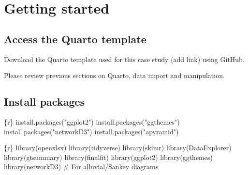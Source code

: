 \documentclass[
  letterpaper,
  DIV=11,
  numbers=noendperiod,
  oneside]{scrreprt}
\newenvironment{Shaded}{\begin{snugshade}}{\end{snugshade}}
\newcommand{\CommentTok}[1]{\textcolor[rgb]{0.37,0.37,0.37}{#1}}
\newcommand{\FunctionTok}[1]{\textcolor[rgb]{0.28,0.35,0.67}{#1}}
\newcommand{\InformationTok}[1]{\textcolor[rgb]{0.37,0.37,0.37}{#1}}
\newcommand{\NormalTok}[1]{\textcolor[rgb]{0.00,0.23,0.31}{#1}}
\newcommand{\StringTok}[1]{\textcolor[rgb]{0.13,0.47,0.30}{#1}}
\begin{document}
\hypertarget{getting-started-1}{%
\section{Getting started}\label{getting-started-1}}

\hypertarget{access-the-quarto-template-1}{%
\subsection{Access the Quarto
template}\label{access-the-quarto-template-1}}

Download the Quarto template used for this case study (add link) using
GitHub.

Please review previous sections on Quarto, data import and manipulation.

\hypertarget{install-packages-1}{%
\subsection{Install packages}\label{install-packages-1}}

\begin{Shaded}
\begin{Highlighting}[]
\InformationTok{\textasciigrave{}\textasciigrave{}\textasciigrave{}\{r\}}
\FunctionTok{install.packages}\NormalTok{(}\StringTok{"ggplot2"}\NormalTok{)}
\FunctionTok{install.packages}\NormalTok{(}\StringTok{"ggthemes"}\NormalTok{)}
\FunctionTok{install.packages}\NormalTok{(}\StringTok{"networkD3"}\NormalTok{)}
\FunctionTok{install.packages}\NormalTok{(}\StringTok{"apyramid"}\NormalTok{)}
\InformationTok{\textasciigrave{}\textasciigrave{}\textasciigrave{}}
\end{Highlighting}
\end{Shaded}

\begin{Shaded}
\begin{Highlighting}[]
\InformationTok{\textasciigrave{}\textasciigrave{}\textasciigrave{}\{r\}}
\FunctionTok{library}\NormalTok{(openxlsx)}
\FunctionTok{library}\NormalTok{(tidyverse)}
\FunctionTok{library}\NormalTok{(skimr)}
\FunctionTok{library}\NormalTok{(DataExplorer)}
\FunctionTok{library}\NormalTok{(gtsummary)}
\FunctionTok{library}\NormalTok{(finalfit)}
\FunctionTok{library}\NormalTok{(ggplot2)}
\FunctionTok{library}\NormalTok{(ggthemes)}
\FunctionTok{library}\NormalTok{(networkD3) }\CommentTok{\# For alluvial/Sankey diagrams}
\InformationTok{\textasciigrave{}\textasciigrave{}\textasciigrave{}}
\end{Highlighting}
\end{Shaded}
\end{document}
